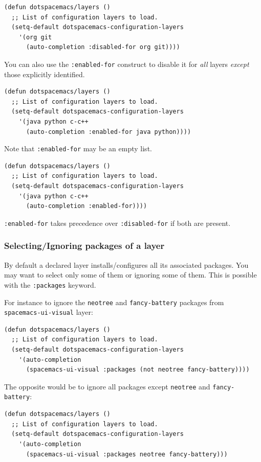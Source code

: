 \documentclass[11pt]{article}
\begin{document}
\begin{verbatim}
(defun dotspacemacs/layers ()
  ;; List of configuration layers to load.
  (setq-default dotspacemacs-configuration-layers
    '(org git
      (auto-completion :disabled-for org git))))
\end{verbatim}

You can also use the \texttt{:enabled-for} construct to disable it for \emph{all} layers
\emph{except} those explicitly identified.

\begin{verbatim}
(defun dotspacemacs/layers ()
  ;; List of configuration layers to load.
  (setq-default dotspacemacs-configuration-layers
    '(java python c-c++
      (auto-completion :enabled-for java python))))
\end{verbatim}

Note that \texttt{:enabled-for} may be an empty list.

\begin{verbatim}
(defun dotspacemacs/layers ()
  ;; List of configuration layers to load.
  (setq-default dotspacemacs-configuration-layers
    '(java python c-c++
      (auto-completion :enabled-for))))
\end{verbatim}

\texttt{:enabled-for} takes precedence over \texttt{:disabled-for} if both are present.

\subsubsection{Selecting/Ignoring packages of a layer}
\label{sec:org675232f}
By default a declared layer installs/configures all its associated packages. You
may want to select only some of them or ignoring some of them. This is possible
with the \texttt{:packages} keyword.

For instance to ignore the \texttt{neotree} and \texttt{fancy-battery} packages from
\texttt{spacemacs-ui-visual} layer:

\begin{verbatim}
(defun dotspacemacs/layers ()
  ;; List of configuration layers to load.
  (setq-default dotspacemacs-configuration-layers
    '(auto-completion
      (spacemacs-ui-visual :packages (not neotree fancy-battery))))
\end{verbatim}

The opposite would be to ignore all packages except \texttt{neotree} and
\texttt{fancy-battery}:

\begin{verbatim}
(defun dotspacemacs/layers ()
  ;; List of configuration layers to load.
  (setq-default dotspacemacs-configuration-layers
    '(auto-completion
      (spacemacs-ui-visual :packages neotree fancy-battery)))
\end{verbatim}
\end{document}
